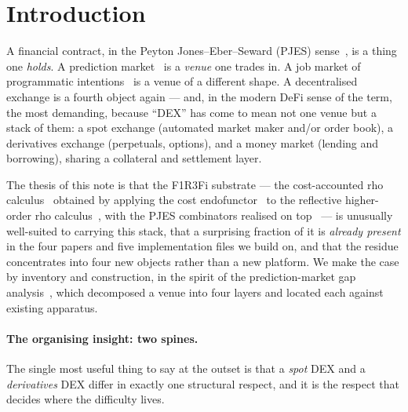 \documentclass[11pt]{article}
\theoremstyle{definition}
\begin{document}
\tableofcontents

\section{Introduction}\label{sec:intro}

A financial contract, in the Peyton Jones--Eber--Seward (PJES) sense~\cite{spj}, is a thing one
\emph{holds}. A prediction market~\cite{predmkt} is a \emph{venue} one trades in. A job market of
programmatic intentions~\cite{ppf} is a venue of a different shape. A decentralised exchange is a
fourth object again --- and, in the modern DeFi sense of the term, the most demanding, because
``DEX'' has come to mean not one venue but a stack of them: a spot exchange (automated market maker
and/or order book), a derivatives exchange (perpetuals, options), and a money market (lending and
borrowing), sharing a collateral and settlement layer.

The thesis of this note is that the F1R3Fi substrate --- the cost-accounted rho
calculus~\cite{cost} obtained by applying the cost endofunctor~\cite{cigslt} to the reflective
higher-order rho calculus~\cite{rho}, with the PJES combinators realised on
top~\cite{finrho} --- is unusually well-suited to carrying this stack, that a surprising fraction of
it is \emph{already present} in the four papers and five implementation files we build on, and that
the residue concentrates into four new objects rather than a new platform. We make the case by
inventory and construction, in the spirit of the prediction-market gap analysis~\cite{predmkt},
which decomposed a venue into four layers and located each against existing apparatus.

\paragraph{The organising insight: two spines.}
The single most useful thing to say at the outset is that a \emph{spot} DEX and a
\emph{derivatives} DEX differ in exactly one structural respect, and it is the respect that decides
where the difficulty lives.
\end{document}
